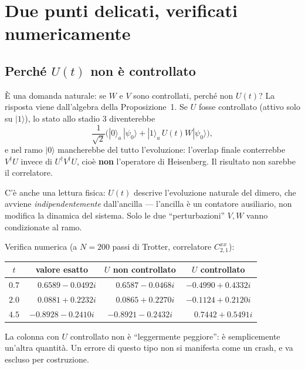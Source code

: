 \documentclass[11pt,a4paper]{article}
\begin{document}
\section{Due punti delicati, verificati numericamente}

\subsection{Perché $U(t)$ non è controllato}

È una domanda naturale: se $W$ e $V$ sono controllati, perché non $U(t)$? La risposta viene
dall'algebra della Proposizione~1. Se $U$ fosse controllato (attivo solo su $|1\rangle$), lo
stato allo stadio 3 diventerebbe
\begin{equation}
\frac{1}{\sqrt2}\Big(|0\rangle_a\,|\psi_0\rangle+|1\rangle_a\,U(t)W|\psi_0\rangle\Big),
\end{equation}
e nel ramo $|0\rangle$ mancherebbe del tutto l'evoluzione: l'overlap finale conterrebbe
$V^\dagger U$ invece di $U^\dagger V^\dagger U$, cioè \textbf{non} l'operatore di Heisenberg.
Il risultato non sarebbe il correlatore.

C'è anche una lettura fisica: $U(t)$ descrive l'evoluzione naturale del dimero, che avviene
\emph{indipendentemente} dall'ancilla --- l'ancilla è un contatore ausiliario, non modifica la
dinamica del sistema. Solo le due ``perturbazioni'' $V,W$ vanno condizionate al ramo.

Verifica numerica (a $N=200$ passi di Trotter, correlatore $C_{2,1}^{xx}$):

\begin{center}
\begin{tabular}{cccc}
\toprule
$t$ & valore esatto & $U$ non controllato & $U$ controllato \\
\midrule
$0.7$ & $\phantom{-}0.6589-0.0492i$ & $\phantom{-}0.6587-0.0468i$ & $-0.4990+0.4332i$ \\
$2.0$ & $\phantom{-}0.0881+0.2232i$ & $\phantom{-}0.0865+0.2270i$ & $-0.1124+0.2120i$ \\
$4.5$ & $-0.8928-0.2410i$ & $-0.8921-0.2432i$ & $\phantom{-}0.7442+0.5491i$ \\
\bottomrule
\end{tabular}
\end{center}

\noindent
La colonna con $U$ controllato non è ``leggermente peggiore'': è semplicemente un'altra
quantità. Un errore di questo tipo non si manifesta come un crash, e va escluso per costruzione.
\end{document}
